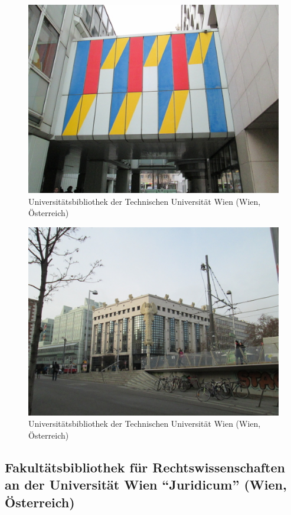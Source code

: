 \documentclass[a4paper,
fontsize=11pt,
oneside,
numbers=noperiodatend,
parskip=half-,
bibliography=totoc,
final
]{scrartcl}
\begin{document}
\begin{figure}[htbp]
\centering
\includegraphics{./img/045.jpg}
\caption{Universitätsbibliothek der Technischen Universität Wien
(Wien,
Österreich)}
\end{figure}

\begin{figure}[htbp]
\centering
\includegraphics{./img/046.jpg}
\caption{Universitätsbibliothek der Technischen Universität Wien
(Wien,
Österreich)}
\end{figure}

\subsection*{Fakultätsbibliothek für Rechtswissenschaften an der
Universität Wien \enquote{Juridicum} (Wien,
Österreich)}\label{fakultuxe4tsbibliothek-fuxfcr-rechtswissenschaften-an-der-universituxe4t-wien-juridicum-wien-uxf6sterreich}
\end{document}
